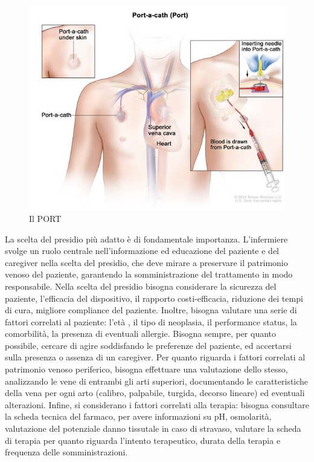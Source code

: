 \begin{figure}[H]
    \begin{center}
    \includegraphics[width=0.6\columnwidth]{img/PORT.jpeg}
    \end{center}
    \caption[Il PORT]{Il PORT
    \cite{img42}}

\end{figure}

La scelta del presidio più adatto è di fondamentale importanza. L’infermiere svolge un ruolo centrale 
nell’informazione ed educazione del paziente e del caregiver nella scelta del presidio, che deve mirare a preservare 
il patrimonio venoso del paziente, garantendo la somministrazione del trattamento in modo responsabile. 
Nella scelta del presidio bisogna considerare la sicurezza del paziente, l’efficacia del dispositivo, il rapporto 
costi-efficacia, riduzione dei tempi di cura, migliore compliance del paziente. Inoltre, bisogna valutare una serie 
di fattori correlati al paziente:  l’età , il tipo di  neoplasia, il performance status, la comorbilità, la presenza 
di eventuali allergie. Bisogna sempre, per quanto possibile, cercare di agire soddisfando le preferenze del paziente, 
ed accertarsi sulla presenza o assenza di un caregiver. Per quanto riguarda i fattori correlati al patrimonio 
venoso periferico, bisogna effettuare una valutazione dello stesso, analizzando le vene di entrambi gli arti superiori,
documentando le caratteristiche della vena per ogni arto (calibro, palpabile, turgida, decorso lineare) ed eventuali 
alterazioni. Infine, si considerano i fattori correlati alla terapia: bisogna consultare la scheda tecnica del farmaco,
per avere informazioni su pH, osmolarità, valutazione del potenziale danno tissutale in caso di stravaso, valutare la 
scheda di terapia per quanto riguarda l’intento terapeutico, durata della terapia e frequenza delle somministrazioni\cite{AIOMCVC}.\\

